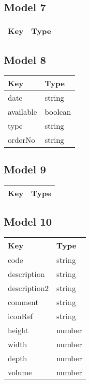 \documentclass[10pt]{article}
\begin{document}
            \subsection{Model 7}
            
            \begin{tabularx}{\textwidth}{lZ}
                \textbf{Key} & \textbf{Type} \\
                \hline
            \end{tabularx}
            \subsection{Model 8}
            
            \begin{tabularx}{\textwidth}{lZ}
                \textbf{Key} & \textbf{Type} \\
                \hline
                    date & string \\
                    available & boolean \\
                    type & string \\
                    orderNo & string \\
            \end{tabularx}
            \subsection{Model 9}
            
            \begin{tabularx}{\textwidth}{lZ}
                \textbf{Key} & \textbf{Type} \\
                \hline
            \end{tabularx}
            \subsection{Model 10}
            
            \begin{tabularx}{\textwidth}{lZ}
                \textbf{Key} & \textbf{Type} \\
                \hline
                    code & string \\
                    description & string \\
                    description2 & string \\
                    comment & string \\
                    iconRef & string \\
                    height & number \\
                    width & number \\
                    depth & number \\
                    volume & number \\
            \end{tabularx}
\end{document}
